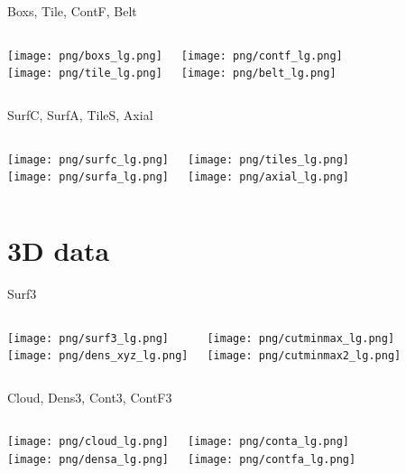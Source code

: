 \documentclass[color=usenames]{beamer}
\begin{document}
\begin{frame}{Boxs, Tile, ContF, Belt}
\begin{columns}
\texttt{[image: png/boxs\_lg.png]}\\
\texttt{[image: png/tile\_lg.png]}

\texttt{[image: png/contf\_lg.png]}\\
\texttt{[image: png/belt\_lg.png]}

\end{columns}
\end{frame}

\begin{frame}{SurfC, SurfA, TileS, Axial}
\begin{columns}
\texttt{[image: png/surfc\_lg.png]}\\
\texttt{[image: png/surfa\_lg.png]}

\texttt{[image: png/tiles\_lg.png]}\\
\texttt{[image: png/axial\_lg.png]}

\end{columns}
\end{frame}


\section{3D data}

\begin{frame}{Surf3}
\begin{columns}
\texttt{[image: png/surf3\_lg.png]}\\
\texttt{[image: png/dens\_xyz\_lg.png]}

\texttt{[image: png/cutminmax\_lg.png]}\\
\texttt{[image: png/cutminmax2\_lg.png]}

\end{columns}
\end{frame}

\begin{frame}{Cloud, Dens3, Cont3, ContF3}
\begin{columns}
\texttt{[image: png/cloud\_lg.png]}\\
\texttt{[image: png/densa\_lg.png]}

\texttt{[image: png/conta\_lg.png]}\\
\texttt{[image: png/contfa\_lg.png]}

\end{columns}
\end{frame}
\end{document}
